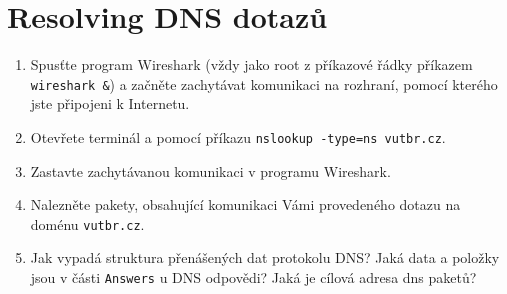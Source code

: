 \section{Resolving DNS dotazů}
\begin{enumerate}
    \item Spusťte program Wireshark (vždy jako root z příkazové řádky příkazem \texttt{wireshark \&}) a začněte zachytávat komunikaci na rozhraní, pomocí kterého jste připojeni k Internetu.
    \item Otevřete terminál a pomocí příkazu \texttt{nslookup -type=ns vutbr.cz}.
    \item Zastavte zachytávanou komunikaci v programu Wireshark.
    \item Nalezněte pakety, obsahující komunikaci Vámi provedeného dotazu na doménu \texttt{vutbr.cz}.
    \item Jak vypadá struktura přenášených dat protokolu DNS? Jaká data a položky jsou v části \texttt{Answers} u DNS odpovědi? Jaká je cílová adresa dns paketů?
\end{enumerate}

\newpage
